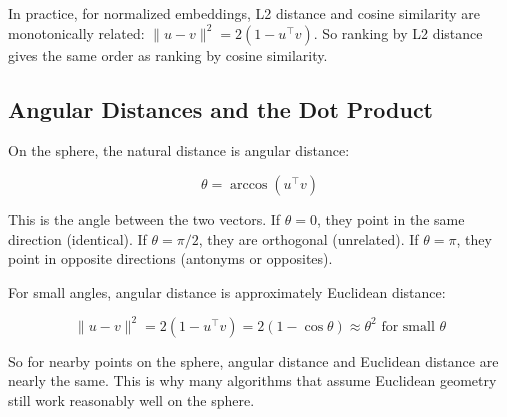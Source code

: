 \vspace{1em}

In practice, for normalized embeddings, L2 distance and cosine similarity are monotonically related: $\|u - v\|^2 = 2(1 - u^\top v)$. So ranking by L2 distance gives the same order as ranking by cosine similarity.

\vspace{1.5em}

\subsection{Angular Distances and the Dot Product}

On the sphere, the natural distance is angular distance:

\begin{equation}
\theta = \arccos(u^\top v)
\end{equation}

This is the angle between the two vectors. If $\theta = 0$, they point in the same direction (identical). If $\theta = \pi/2$, they are orthogonal (unrelated). If $\theta = \pi$, they point in opposite directions (antonyms or opposites).

For small angles, angular distance is approximately Euclidean distance:

\begin{equation}
\|u - v\|^2 = 2(1 - u^\top v) = 2(1 - \cos\theta) \approx \theta^2 \text{ for small } \theta
\end{equation}

So for nearby points on the sphere, angular distance and Euclidean distance are nearly the same. This is why many algorithms that assume Euclidean geometry still work reasonably well on the sphere.

\vspace{1.5em}


